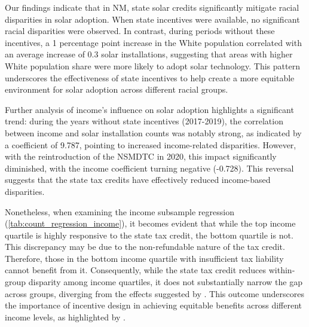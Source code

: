 \documentclass[11pt,twoside,letterpaper]{article}
\begin{document}
Our findings indicate that in NM, state solar credits significantly mitigate racial disparities in solar adoption. When state incentives were available, no significant racial disparities were observed. In contrast, during periods without these incentives, a 1 percentage point increase in the White population correlated with an average increase of 0.3 solar installations, suggesting that areas with higher White population share were more likely to adopt solar technology. This pattern underscores the effectiveness of state incentives to help create a more equitable environment for solar adoption across different racial groups. 

Further analysis of income’s influence on solar adoption highlights a significant trend: during the years without state incentives (2017-2019), the correlation between income and solar installation counts was notably strong, as indicated by a coefficient of 9.787, pointing to increased income-related disparities. However, with the reintroduction of the NSMDTC in 2020, this impact significantly diminished, with the income coefficient turning negative (-0.728). This reversal suggests that the state tax credits have effectively reduced income-based disparities. 

Nonetheless, when examining the income subsample regression (\autoref{tab:count_regression_income}), it becomes evident that while the top income quartile is highly responsive to the state tax credit, the bottom quartile is not. This discrepancy may be due to the non-refundable nature of the tax credit. Therefore, those in the bottom income quartile with insufficient tax liability cannot benefit from it. Consequently, while the state tax credit reduces within-group disparity among income quartiles, it does not substantially narrow the gap across groups, diverging from the effects suggested by \textcite{oshaughnessy_rooftop_2022}. This outcome underscores the importance of incentive design in achieving equitable benefits across different income levels, as highlighted by \textcite{borenstein_distributional_2016}.

\end{document}
